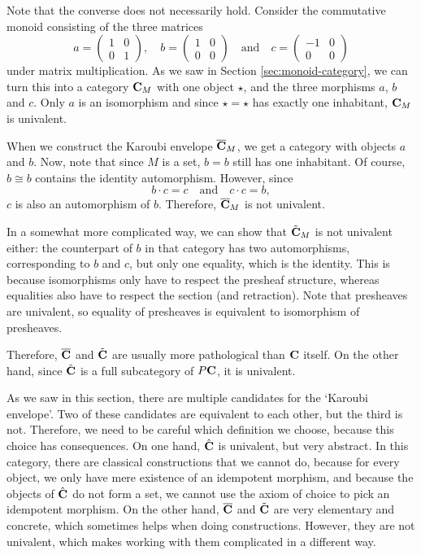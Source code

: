 \begin{remark}
  Note that the converse does not necessarily hold. Consider the commutative monoid consisting of the three matrices
  \[
    a = \begin{pmatrix}
      1 & 0\\0 & 1
    \end{pmatrix}, \quad
    b = \begin{pmatrix}
      1 & 0\\0 & 0
    \end{pmatrix} \quad \text{and} \quad
    c = \begin{pmatrix}
      -1 & 0\\0 & 0
    \end{pmatrix}
  \]
  under matrix multiplication. As we saw in Section \ref{sec:monoid-category}, we can turn this into a category $ \mathbf{C}_M $ with one object $ \star $, and the three morphisms $ a $, $ b $ and $ c $. Only $ a $ is an isomorphism and since $ \star = \star $ has exactly one inhabitant, $ \mathbf{C}_M $ is univalent.

  When we construct the Karoubi envelope $ \overline {\mathbf{C}}_M $, we get a category with objects $ a $ and $ b $. Now, note that since $ M $ is a set, $ b = b $ still has one inhabitant. Of course, $ b \cong b $ contains the identity automorphism. However, since
  \[ b \cdot c = c \quad \text{and} \quad c \cdot c = b, \]
  $ c $ is also an automorphism of $ b $. Therefore, $ \overline {\mathbf{C}}_M $ is not univalent.

  In a somewhat more complicated way, we can show that $ \tilde {\mathbf{C}}_M $ is not univalent either: the counterpart of $ b $ in that category has two automorphisms, corresponding to $ b $ and $ c $, but only one equality, which is the identity. This is because isomorphisms only have to respect the presheaf structure, whereas equalities also have to respect the section (and retraction). Note that presheaves are univalent, so equality of presheaves is equivalent to isomorphism of presheaves.

  Therefore, $ \overline {\mathbf{C}} $ and $ \tilde {\mathbf{C}} $ are usually more pathological than $ \mathbf{C} $ itself. On the other hand, since $ \hat {\mathbf{C}} $ is a full subcategory of $ P\mathbf{C} $, it is univalent.
\end{remark}

\begin{remark}
  As we saw in this section, there are multiple candidates for the `Karoubi envelope'. Two of these candidates are equivalent to each other, but the third is not. Therefore, we need to be careful which definition we choose, because this choice has consequences. On one hand, $ \hat {\mathbf{C}} $ is univalent, but very abstract. In this category, there are classical constructions that we cannot do, because for every object, we only have mere existence of an idempotent morphism, and because the objects of $ \hat {\mathbf{C}} $ do not form a set, we cannot use the axiom of choice to pick an idempotent morphism. On the other hand, $ \overline {\mathbf{C}} $ and $ \tilde {\mathbf{C}} $ are very elementary and concrete, which sometimes helps when doing constructions. However, they are not univalent, which makes working with them complicated in a different way.
\end{remark}


